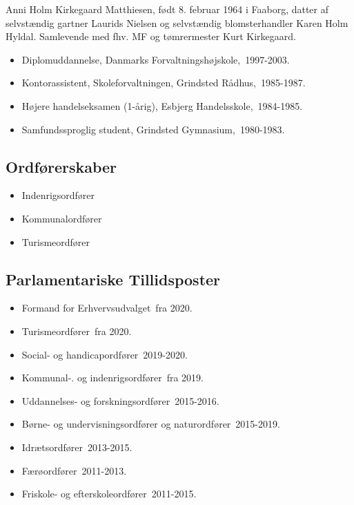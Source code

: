 \documentclass[11pt, a4paper]{awesome-cv}
\begin{document}
\makecvheader[R]
\makelettertitle
\begin{cvletter}
Anni Holm Kirkegaard Matthiesen, født 8. februar 1964 i Faaborg, datter af selvstændig gartner Laurids Nielsen og selvstændig blomsterhandler Karen Holm Hyldal. Samlevende med fhv. MF og tømrermester Kurt Kirkegaard.

\begin{itemize}
\item Diplomuddannelse, Danmarks Forvaltningshøjskole, 1997-2003.
\item Kontorassistent, Skoleforvaltningen, Grindsted Rådhus, 1985-1987.
\item Højere handelseksamen (1-årig), Esbjerg Handelsskole, 1984-1985.
\item Samfundssproglig student, Grindsted Gymnasium, 1980-1983.
\end{itemize}
\subsection*{Ordførerskaber}
\begin{itemize}
\item Indenrigsordfører
\item Kommunalordfører
\item Turismeordfører
\end{itemize}
\subsection*{Parlamentariske Tillidsposter}
\begin{itemize}
\item Formand for Erhvervsudvalget fra 2020.
\item Turismeordfører fra 2020.
\item Social- og handicapordfører 2019-2020.
\item Kommunal-. og indenrigsordfører fra 2019.
\item Uddannelses- og forskningsordfører 2015-2016.
\item Børne- og undervisningsordfører og naturordfører 2015-2019.
\item Idrætsordfører 2013-2015.
\item Færøordfører 2011-2013.
\item Friskole- og efterskoleordfører 2011-2015.
\end{itemize}

\end{cvletter}
\end{document}
